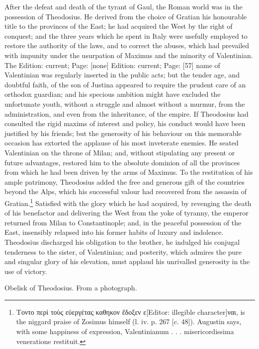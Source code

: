 After the defeat and death of the tyrant of Gaul, the Roman world was in the possession of Theodosius. He derived from the choice of Gratian his honourable title to the provinces of the East; he had acquired the West by the right of conquest; and the three years which he spent in Italy were usefully employed to restore the authority of the laws, and to correct the abuses, which had prevailed with impunity under the usurpation of Maximus and the minority of Valentinian. The Edition: current; Page: [none] Edition: current; Page: [57] name of Valentinian was regularly inserted in the public acts; but the tender age, and doubtful faith, of the son of Justina appeared to require the prudent care of an orthodox guardian; and his specious ambition might have excluded the unfortunate youth, without a struggle and almost without a murmur, from the administration, and even from the inheritance, of the empire. If Theodosius had consulted the rigid maxims of interest and policy, his conduct would have been justified by his friends; but the generosity of his behaviour on this memorable occasion has extorted the applause of his most inveterate enemies. He seated Valentinian on the throne of Milan; and, without stipulating any present or future advantages, restored him to the absolute dominion of all the provinces from which he had been driven by the arms of Maximus. To the restitution of his ample patrimony, Theodosius added the free and generous gift of the countries beyond the Alps, which his successful valour had recovered from the assassin of Gratian.\footnote{\textgreek{Τοντο περ\texthebrew{ὶ} το\texthebrew{ὺ}ς ε\texthebrew{ὐ}εργέτας καθηκον \texthebrew{ἔ}δοξεν ε}[Editor: illegible character]\textgreek{ναι}, is the niggard praise of Zosimus himself (l. iv. p. 267 [c. 48]). Augustin says, with some happiness of expression, Valentinianum . . . misericordissima veneratione restituit.} Satisfied with the glory which he had acquired, by revenging the death of his benefactor and delivering the West from the yoke of tyranny, the emperor returned from Milan to Constantinople; and, in the peaceful possession of the East, insensibly relapsed into his former habits of luxury and indolence. Theodosius discharged his obligation to the brother, he indulged his conjugal tenderness to the sister, of Valentinian; and posterity, which admires the pure and singular glory of his elevation, must applaud his unrivalled generosity in the use of victory.

Obelisk of Theodosius. From a photograph.

